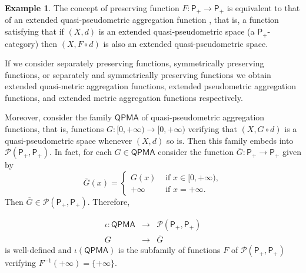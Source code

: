 \documentclass[11pt,a4paper]{amsart}
\theoremstyle{definition}
\newtheorem{example}[theorem]{Example}
\begin{document}
	
	\begin{example}\label{ex:preservingm}
		The concept of preserving function $F:\mathsf{P}_+\to \mathsf{P}_+$ is equivalent to that of an extended quasi-pseudometric aggregation function \cite{MassaVale13}, that is, a function satisfying that if $(X,d)$ is an extended quasi-pseudometric space (a $\mathsf{P}_+$-category) then $(X,F\circ d)$ is also an extended quasi-pseudometric space.
		
		If we consider separately preserving functions, symmetrically preserving functions, or separately and symmetrically preserving functions we obtain extended quasi-metric aggregation functions, extended pseudometric aggregation functions, and extended metric aggregation functions respectively.
		
		
		
		
		Moreover, consider the family $\mathsf{QPMA}$ of quasi-pseudometric aggregation functions, that is, functions  $G:[0,+\infty)\to [0,+\infty)$ verifying that  $(X,G\circ d)$ is a quasi-pseudometric space whenever $(X,d)$ so is. Then this family embeds into $\mathscr{P}(\mathsf{P}_+,\mathsf{P}_+)$. In fact, for each $G\in \mathsf{QPMA}$ consider the function $\overline{G}:\mathsf{P}_+\to \mathsf{P}_+$ given by 
		$$\overline{G}(x)=\begin{cases} G(x) &\text{ if }x\in [0,+\infty),\\ +\infty &\text{ if }x=+\infty.\end{cases}$$ 
		Then $\overline{G}\in \mathscr{P}(\mathsf{P}_+,\mathsf{P}_+).$ Therefore, 
		
		$$\begin{array}{ccc}
			
			\iota:\mathsf{QPMA}&\to&\mathscr{P}(\mathsf{P}_+,\mathsf{P}_+)\\[5pt]
			G&\to&\overline{G}
		\end{array}$$
		is well-defined and $\iota(\mathsf{QPMA})$ is the subfamily of functions $F$ of $\mathscr{P}(\mathsf{P}_+,\mathsf{P}_+)$ verifying 
		$F^{-1}(+\infty)=\{+\infty\}.$ 
		
		
	\end{example}
	
\end{document}
